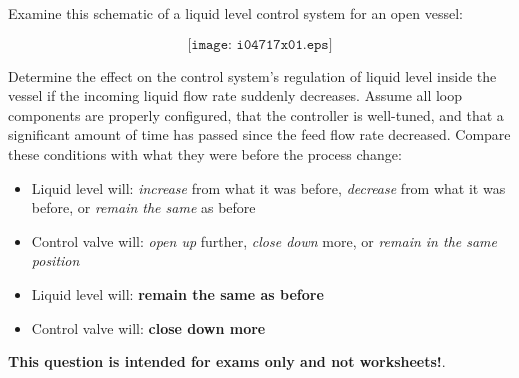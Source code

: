 

Examine this schematic of a liquid level control system for an open vessel:

$$\texttt{[image: i04717x01.eps]}$$

Determine the effect on the control system's regulation of liquid level inside the vessel if the incoming liquid flow rate suddenly decreases.  Assume all loop components are properly configured, that the controller is well-tuned, and that a significant amount of time has passed since the feed flow rate decreased.  Compare these conditions with what they were before the process change:

\begin{itemize}
\item{} Liquid level will: {\it increase} from what it was before, {\it decrease} from what it was before, or {\it remain the same} as before
\vskip 10pt
\item{} Control valve will: {\it open up} further, {\it close down} more, or {\it remain in the same position} 
\end{itemize}







\begin{itemize}
\item{} Liquid level will: {\bf remain the same as before}
\vskip 10pt
\item{} Control valve will: {\bf close down more}
\end{itemize}







{\bf This question is intended for exams only and not worksheets!}.


